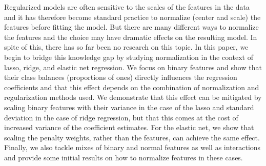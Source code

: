Regularized models are often sensitive to the scales of the features in the data and it has
therefore become standard practice to normalize (center and scale) the features before
fitting the model. But there are many different ways to normalize the features and the
choice may have dramatic effects on the resulting model. In spite of this, there has so far
been no research on this topic. In this paper, we begin to bridge this knowledge gap by
studying normalization in the context of lasso, ridge, and elastic net regression. We focus
on binary features and show that their class balances (proportions of ones) directly
influences the regression coefficients and that this effect depends on the combination of
normalization and regularization methods used. We demonstrate that this effect can be
mitigated by scaling binary features with their variance in the case of the lasso and
standard deviation in the case of ridge regression, but that this comes at the cost of
increased variance of the coefficient estimates. For the elastic net, we show that scaling
the penalty weights, rather than the features, can achieve the same effect. Finally, we
also tackle mixes of binary and normal features as well as interactions and provide some
initial results on how to normalize features in these cases.
